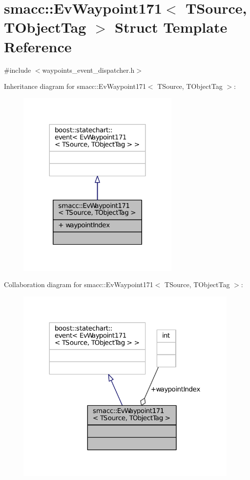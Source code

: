 \hypertarget{structsmacc_1_1EvWaypoint171}{}\section{smacc\+:\+:Ev\+Waypoint171$<$ T\+Source, T\+Object\+Tag $>$ Struct Template Reference}
\label{structsmacc_1_1EvWaypoint171}


{\ttfamily \#include $<$waypoints\+\_\+event\+\_\+dispatcher.\+h$>$}



Inheritance diagram for smacc\+:\+:Ev\+Waypoint171$<$ T\+Source, T\+Object\+Tag $>$\+:
\nopagebreak
\begin{figure}[H]
\begin{center}
\leavevmode
\includegraphics[width=227pt]{structsmacc_1_1EvWaypoint171__inherit__graph}
\end{center}
\end{figure}


Collaboration diagram for smacc\+:\+:Ev\+Waypoint171$<$ T\+Source, T\+Object\+Tag $>$\+:
\nopagebreak
\begin{figure}[H]
\begin{center}
\leavevmode
\includegraphics[width=312pt]{structsmacc_1_1EvWaypoint171__coll__graph}
\end{center}
\end{figure}
